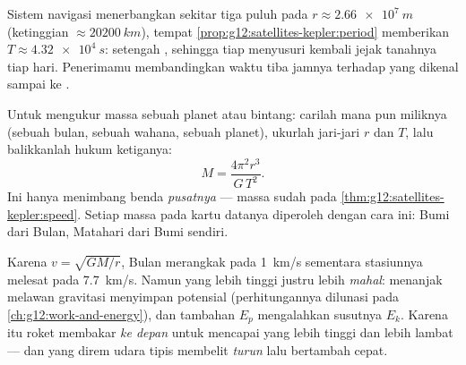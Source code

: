 \begin{example}\label{ex:g12:satellites-kepler:gps}
Sistem navigasi  menerbangkan sekitar tiga puluh  pada
$r \approx \qty{2.66e7}{m}$ (ketinggian $\approx \qty{20200}{km}$),
tempat \cref{prop:g12:satellites-kepler:period} memberikan $T \approx
\qty{4.32e4}{s}$: setengah , sehingga tiap  menyusuri
kembali jejak tanahnya tiap hari. Penerimamu membandingkan waktu tiba 
jamnya terhadap  yang dikenal sampai ke .
\end{example}

\begin{method}\label{met:g12:satellites-kepler:weigh}
%
Untuk mengukur massa sebuah planet atau bintang: carilah  mana pun
miliknya (sebuah bulan, sebuah wahana, sebuah planet), ukurlah jari-jari
 $r$ dan 
$T$, lalu balikkanlah hukum ketiganya:
\[ M = \frac{4\pi^2 r^3}{G\,T^2}. \]
Ini hanya menimbang benda \emph{pusatnya} --- massa  sudah  pada \cref{thm:g12:satellites-kepler:speed}. Setiap massa pada
kartu datanya diperoleh dengan cara ini: Bumi dari Bulan, Matahari dari 
Bumi sendiri.
\end{method}

\begin{remark}\label{rem:g12:satellites-kepler:energy}
Karena $v = \sqrt{GM/r}$, Bulan merangkak pada \qty{1}{km/s} sementara
stasiunnya melesat pada \qty{7.7}{km/s}. Namun  yang lebih tinggi justru
lebih \emph{mahal}: menanjak melawan gravitasi menyimpan  potensial
(perhitungannya dilunasi pada \cref{ch:g12:work-and-energy}), dan tambahan
$E_p$ mengalahkan susutnya $E_k$. Karena itu roket membakar \emph{ke depan}
untuk mencapai  yang lebih tinggi dan lebih lambat --- dan  yang
direm udara tipis membelit \emph{turun} lalu bertambah cepat.
\end{remark}

